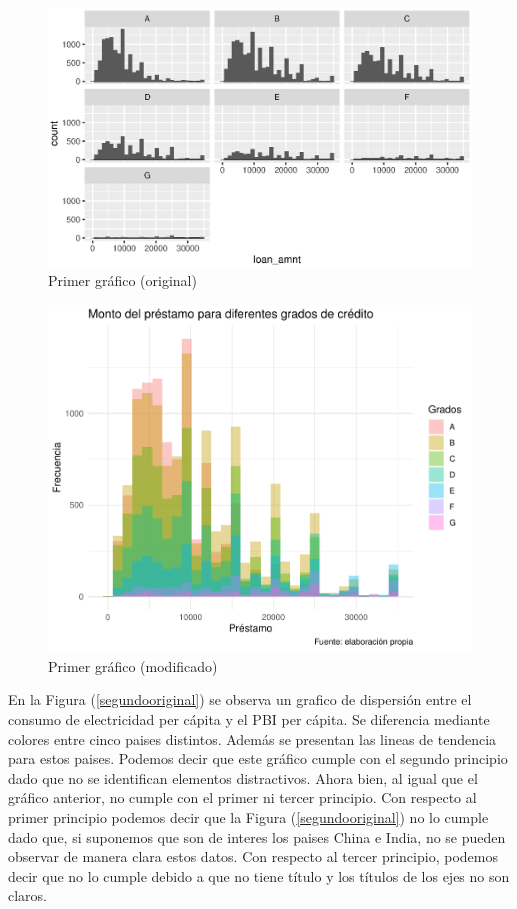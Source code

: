 \documentclass[12pt]{article}
\begin{document}
\begin{figure}[htbp]
    \centering
\includegraphics[width = \textwidth]{graficos/primergrafico_original.eps}
    \caption{ Primer gráfico (original)}
    \label{primerooriginal}
\end{figure}

\begin{figure}[hbtp]
    \centering
\includegraphics[width = \textwidth]{graficos/primergrafico_modificado_mod.pdf}
    \caption{ Primer gráfico (modificado)}
    \label{primeromod}
\end{figure}

En la Figura (\ref{segundooriginal}) se observa un grafico de dispersión entre el consumo de electricidad per cápita y el PBI per cápita. Se diferencia mediante colores entre cinco paises distintos. Además se presentan las lineas de tendencia para estos paises. Podemos decir que este gráfico cumple con el segundo principio dado que no se identifican elementos distractivos. Ahora bien, al igual que el gráfico anterior, no cumple con el primer ni tercer principio. Con respecto al primer principio podemos decir que la Figura (\ref{segundooriginal}) no lo cumple dado que, si suponemos que son de interes los paises China e India, no se pueden observar de manera clara estos datos. Con respecto al tercer principio, podemos decir que no lo cumple debido a que no tiene título y los títulos de los ejes no son claros. 
\end{document}
